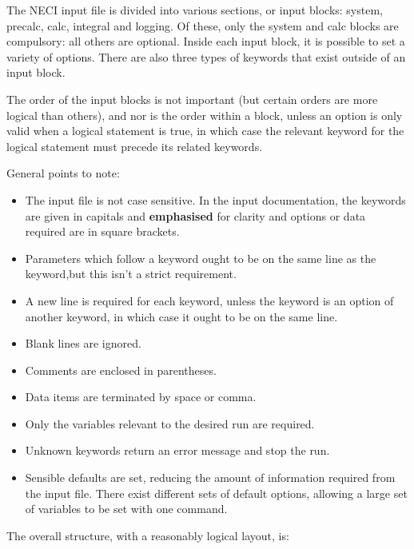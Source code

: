 \documentclass[openany,a4paper,10pt]{manual}
\begin{document}
The NECI input file is divided into various sections, or input blocks: system, precalc, calc, integral and logging.  Of these, only the system and calc blocks are compulsory: all others are optional.  Inside each input block, it is possible to set a variety of options.  There are also three types of keywords that exist outside of an input block.

The order of the input blocks is not important (but certain orders are more logical than others), and nor is the order within a block, unless an option is only valid when a logical statement is true, in which case the relevant keyword for the logical statement must precede its related keywords.

General points to note:
\begin{itemize}
\item {} 
The input file is not case sensitive.  In the input documentation, the keywords are given in capitals and \textbf{emphasised} for clarity and options or data required are in square brackets.

\item {} 
Parameters which follow a keyword ought to be on the same line as the keyword,but this isn't a strict requirement.

\item {} 
A new line is required for each keyword, unless the keyword is an option of another keyword, in which case it ought to be on the same line.

\item {} 
Blank lines are ignored.

\item {} 
Comments are enclosed in parentheses.

\item {} 
Data items are terminated by space or comma.

\item {} 
Only the variables relevant to the desired run are required.

\item {} 
Unknown keywords return an error message and stop the run.

\item {} 
Sensible defaults are set, reducing the amount of information required from the input file.  There exist different sets of default options, allowing a large set of variables to be set with one command.

\end{itemize}

The overall structure, with a reasonably logical layout, is:
\end{document}
